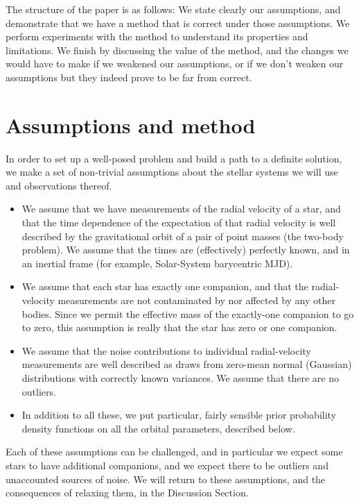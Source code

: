 \documentclass[12pt, preprint]{aastex6}
\begin{document}
The structure of the paper is as follows:
We state clearly our assumptions, and demonstrate that we have a
method that is correct under those assumptions.
We perform experiments with the method to understand its properties
and limitations.
We finish by discussing the value of the method, and the changes we
would have to make if we weakened our assumptions, or if we don't
weaken our assumptions but they indeed prove to be far from correct.

\section{Assumptions and method}

In order to set up a well-posed problem and build a path to a
definite solution, we make a set of non-trivial assumptions about the
stellar systems we will use and observations thereof.
\begin{itemize}
\item We assume that we have measurements of the radial velocity of a
  star, and that the time dependence of the expectation of that radial
  velocity is well described by the gravitational orbit of a pair of
  point masses (the two-body problem). We assume that the times are
  (effectively) perfectly known, and in an inertial frame (for
  example, Solar-System barycentric MJD).
\item We assume that each star has exactly one companion, and that the
  radial-velocity measurements are not contaminated by nor affected by
  any other bodies. Since we permit the effective mass of the
  exactly-one companion to go to zero, this assumption is really that
  the star has zero or one companion.
\item We assume that the noise contributions to individual
  radial-velocity measurements are well described as draws from
  zero-mean normal (Gaussian) distributions with correctly known
  variances. We assume that there are no outliers.
\item In addition to all these, we put particular, fairly sensible
  prior probability density functions on all the orbital parameters,
  described below.
\end{itemize}
Each of these assumptions can be challenged, and in particular we
expect some stars to have additional companions, and we expect there
to be outliers and unaccounted sources of noise.
We will return to these assumptions, and the consequences of relaxing
them, in the Discussion Section.
\end{document}
